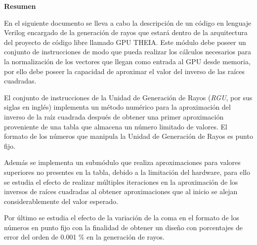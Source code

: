 





\begin{center}\huge{\textbf{Resumen}}\end{center}


En el siguiente documento se lleva a cabo la descripción de un código en lenguaje Verilog encargado de la generación de rayos que estará dentro de la arquitectura del proyecto de código libre llamado GPU THEIA. Este módulo debe poseer un conjunto de instrucciones de modo que pueda realizar los cálculos necesarios para la normalización de los vectores que llegan como entrada al GPU desde memoria, por ello debe poseer la capacidad de aproximar el valor del inverso de las raíces cuadradas.  

El conjunto de instrucciones de la Unidad de Generación de Rayos (\textit{RGU}, por sus siglas en inglés) implementa un método numérico para la aproximación del inverso de la raíz cuadrada después de obtener una primer aproximación proveniente de una tabla que almacena un número limitado de valores. El formato de los números que manipula la Unidad de Generación de Rayos es punto fijo.

Además se implementa un submódulo que realiza aproximaciones para valores superiores no presentes en la tabla, debido a la limitación del hardware, para ello se estudia el efecto de realizar múltiples iteraciones en la aproximación de los inversos de raíces cuadradas al obtener aproximaciones que al inicio se alejan considerablemente del valor esperado.

Por último se estudia el efecto de la variación de la coma en el formato de los números en punto fijo con la finalidad de obtener un diseño con porcentajes de error del orden de 0.001 \% en la generación de rayos.